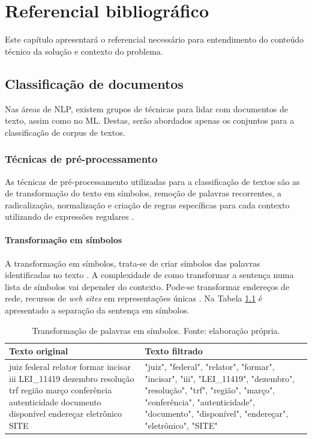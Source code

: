 \chapter[Referêncial bibliográfico]{Referencial bibliográfico}

Este capítulo apresentará o referencial necessário para entendimento do conteúdo técnico da solução e contexto do problema.
\section{Classificação de documentos}

Nas áreas de NLP, existem grupos de técnicas para lidar com documentos de texto, assim como no ML. Destas, serão abordados apenas os conjuntos para a classificação de corpus de textos.

\subsection{Técnicas de pré-processamento}
As técnicas de pré-processamento utilizadas para a classificação de textos são as de transformação do texto em símbolos, remoção de palavras recorrentes, a radicalização, normalização e criação de regras específicas para cada contexto utilizando de expressões regulares \cite{OLIVEIRA2017}.

\subsubsection{Transformação em símbolos}

A transformação em símbolos, trata-se de criar símbolos das palavras identificadas no texto \cite{MANNING2008}.
A complexidade de como transformar a sentença numa lista de símbolos vai depender do contexto. Pode-se transformar endereços de rede, recursos de \textit{web sites} em representações únicas \cite{MANNING2008}. Na Tabela \ref{tab:palavrasSimbolos} é apresentado a separação da sentença em símbolos.

\begin{table}[h]
	\centering    
	\caption[Transformação de palavras em símbolos]{Transformação de palavras em símbolos. Fonte: elaboração própria.}
    \label{tab:palavrasSimbolos}
	\begin{tabular}{|p{7cm}|p{7cm}|}
    \hline
    \textbf{Texto original} & \textbf{Texto filtrado}\\ \hline
	juiz federal relator formar incisar iii LEI\_11419 dezembro resolução trf região março conferência autenticidade documento disponível endereçar eletrônico SITE & "juiz", "federal", "relator", "formar", "incisar", "iii", "LEI\_11419", "dezembro", "resolução", "trf", "região", "março", "conferência", "autenticidade", "documento", "disponível", "endereçar", "eletrônico", "SITE"
    \\ \hline
    \end{tabular}
\end{table}

